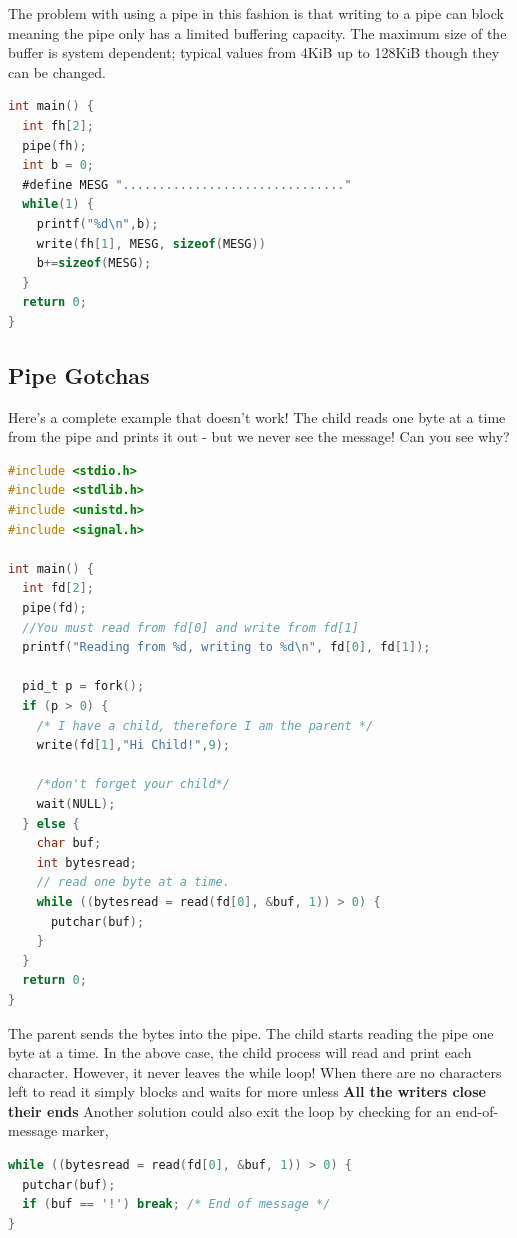 The problem with using a pipe in this fashion is that writing to a pipe can block meaning the pipe only has a limited buffering capacity.
The maximum size of the buffer is system dependent; typical values from 4KiB up to 128KiB though they can be changed.

\begin{lstlisting}[language=C]
int main() {
  int fh[2];
  pipe(fh);
  int b = 0;
  #define MESG "..............................."
  while(1) {
    printf("%d\n",b);
    write(fh[1], MESG, sizeof(MESG))
    b+=sizeof(MESG);
  }
  return 0;
}
\end{lstlisting}

\subsection{Pipe Gotchas}

Here's a complete example that doesn't work!
The child reads one byte at a time from the pipe and prints it out - but we never see the message!
Can you see why?

\begin{lstlisting}[language=C]
#include <stdio.h>
#include <stdlib.h>
#include <unistd.h>
#include <signal.h>

int main() {
  int fd[2];
  pipe(fd);
  //You must read from fd[0] and write from fd[1]
  printf("Reading from %d, writing to %d\n", fd[0], fd[1]);

  pid_t p = fork();
  if (p > 0) {
    /* I have a child, therefore I am the parent */
    write(fd[1],"Hi Child!",9);

    /*don't forget your child*/
    wait(NULL);
  } else {
    char buf;
    int bytesread;
    // read one byte at a time.
    while ((bytesread = read(fd[0], &buf, 1)) > 0) {
      putchar(buf);
    }
  }
  return 0;
}
\end{lstlisting}

The parent sends the bytes  into the pipe.
The child starts reading the pipe one byte at a time.
In the above case, the child process will read and print each character.
However, it never leaves the while loop!
When there are no characters left to read it simply blocks and waits for more unless \textbf{All the writers close their ends}
Another solution could also exit the loop by checking for an end-of-message marker,

\begin{lstlisting}[language=C]
while ((bytesread = read(fd[0], &buf, 1)) > 0) {
  putchar(buf);
  if (buf == '!') break; /* End of message */
}
\end{lstlisting}


